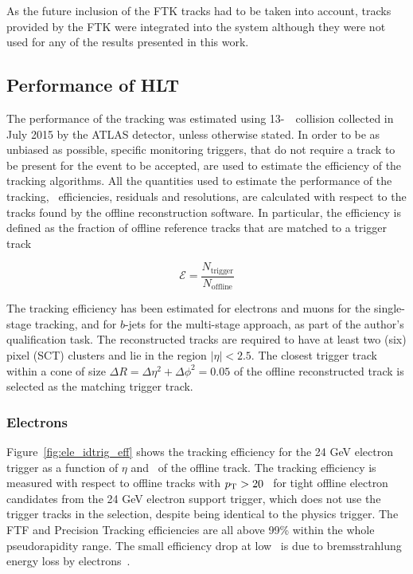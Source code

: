 			As the future inclusion of the FTK tracks had to be taken into account, tracks provided by the FTK were integrated into the system although they were not used for any of the results presented in this work. 




		\subsection{Performance of HLT}
		\label{sec:Trig_perf}

			The performance of the tracking was estimated using 13-\TeV\ \pp\ collision collected in July 2015 by the ATLAS detector, unless otherwise stated. In order to be as unbiased as possible, specific monitoring triggers, that do not require a track to be present for the event to be accepted, are used to estimate the efficiency of the tracking algorithms. All the quantities used to estimate the performance of the tracking, \ie\ efficiencies, residuals and resolutions, are calculated with respect to the tracks found by the offline reconstruction software. In particular, the efficiency is defined as the fraction of offline reference tracks that are matched to a trigger track 

			\begin{equation}
				\mathcal{E} = \frac{N_{\mathrm{trigger}}}{N_{\mathrm{offline}}}
				\label{eq:trig_eff}
			\end{equation}

			The tracking efficiency has been estimated for electrons and muons for the single-stage tracking, and for $b$-jets for the multi-stage approach, as part of the author's qualification task. The reconstructed tracks are required to have at least two (six) pixel (SCT) clusters and lie in the region $\left | \eta \right | < 2.5$. The closest trigger track within a cone of size $\Delta R =  \Delta \eta^2 + \Delta \phi^2 = 0.05$ of the offline reconstructed track is selected as the matching trigger track.


			\subsubsection*{Electrons}

				Figure~\ref{fig:ele_idtrig_eff} shows the tracking efficiency for the 24 GeV electron trigger as a function of $\eta$ and \pt\ of the offline track. The tracking efficiency is measured with respect to offline tracks with $p_{\mathrm{T}} > 20$ \GeV\ for tight offline electron candidates from the 24 GeV electron support trigger, which does not use the trigger tracks in the selection, despite being identical to the physics trigger. The FTF and Precision Tracking efficiencies are all above 99\% within the whole pseudorapidity range. The small efficiency drop at low \pt\ is due to bremsstrahlung energy loss by electrons~\cite{ATLASTrigger2015}.

